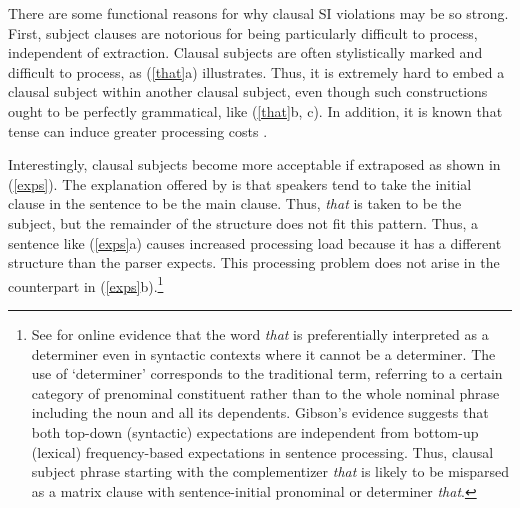 \documentclass[output=paper
	        ,collection
	        ,collectionchapter
 	        ,biblatex
                ,babelshorthands
                ,newtxmath
                ,draftmode
                ,colorlinks, citecolor=brown
]{langscibook}
\begin{document}
\zl

%



There are some functional reasons for why clausal SI violations may be so strong. First, subject clauses are notorious for being particularly difficult to process, independent of extraction. Clausal  subjects  are often  stylistically marked and difficult  to process,   as  (\ref{that}a) illustrates. Thus, it is extremely hard to embed a  clausal subject within another clausal subject, even though such constructions ought to be perfectly grammatical,  like (\ref{that}b, c). In addition, it is known that tense can induce greater processing costs
 \citep{kluender92,gibson0000}. 

\eal  \label{that}

 
\zl


\noindent
 Interestingly, clausal subjects become more acceptable if  extraposed as shown in (\ref{exps}).
The explanation offered by  \citet[356--357]{fod74} is that speakers tend to  take the initial clause in the sentence  to be the  main clause. Thus, \emph{that} is taken to be the subject, but the remainder
of the structure does not fit this pattern. Thus, a sentence like (\ref{exps}a) causes
 increased  processing  load  because  it has a  different structure 
than the parser expects.
This processing problem does not arise
in the counterpart in (\ref{exps}b).\footnote{See  \citet{gibson07} for online evidence
that  the word \emph{that} is preferentially interpreted as a determiner even in syntactic contexts where it cannot be a determiner. The use of `determiner' corresponds to the traditional term, referring to a certain category of
 prenominal constituent rather than to the whole nominal phrase including the noun and all its dependents.
 Gibson's evidence suggests that both top-down (syntactic) expectations are independent from bottom-up (lexical) frequency-based expectations in sentence processing. Thus, 
clausal subject phrase  starting with the complementizer
\emph{that} is likely to be misparsed as a matrix clause with sentence-initial  pronominal or determiner \emph{that}.}
\end{document}
